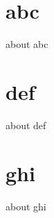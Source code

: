 \documentclass{book}
\begin{document}
\chapter{abc}

about abc

\chapter{def}

about def

\chapter{ghi}

about ghi
\end{document}
